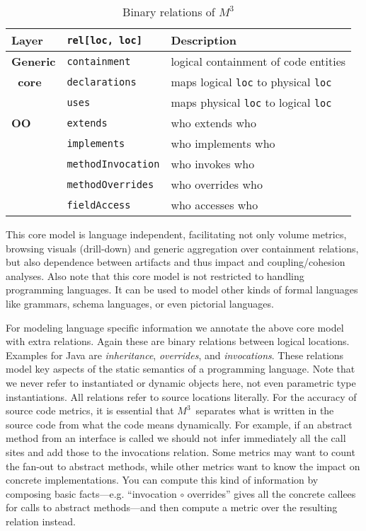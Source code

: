 \documentclass[conference]{IEEEtran}
\newcommand{\mthree}{\ensuremath{M^3}\xspace}
\begin{document}
\begin{table}[t]
\begin{tabularx}{\columnwidth}{|l|l|X|}\hline
 Layer & \lstinline!rel[loc, loc]! & Description \\ \hline 
\textbf{Generic} & \lstinline!containment! & logical containment of 
code entities \\
\textbf{~core} & \lstinline!declarations! & maps logical \lstinline!loc! to physical \lstinline!loc! \\
& \lstinline!uses! & maps physical \lstinline!loc! to logical \lstinline!loc! \\ \hline
 \textbf{OO} & \lstinline!extends! & who extends who \\
& \lstinline!implements! & who implements who \\
& \lstinline!methodInvocation! & who invokes who \\
& \lstinline!methodOverrides! & who overrides who \\
& \lstinline!fieldAccess! & who accesses who \\ \hline
\end{tabularx}
\caption{Binary relations of \mthree \label{table:core}}\vspace{-9mm}
\end{table}

This core model is language independent, facilitating not only volume metrics,
browsing visuals (drill-down) and generic aggregation over containment
relations, but also dependence between artifacts and thus impact and
coupling/cohesion analyses. Also note that this core model is not restricted
to handling programming languages. It can be used to model other kinds of
formal languages like grammars, schema languages, or even pictorial languages.

For modeling language specific information we annotate the above core model
with extra relations. Again these are binary relations between logical
locations. Examples for Java are \emph{inheritance}, \emph{overrides}, and
\emph{invocations}. These relations model key aspects of the static semantics
of a programming language. Note that we never refer to instantiated or dynamic
objects here, not even parametric type instantiations. All relations refer to
source locations literally. For the accuracy of source code metrics, it is
essential that \mthree\  separates what is written in the source code from
what the code means dynamically. For example, if an abstract method from an
interface is called we should not infer immediately all the call sites and add
those to the invocations relation. Some metrics may want to count the fan-out
to abstract methods, while other metrics want to know the impact on concrete
implementations. You can compute this kind of information by composing basic
facts---e.g. ``invocation $\circ$ overrides'' gives all the concrete callees
for calls to abstract methods---and then compute a metric over the resulting
relation instead.
\end{document}
